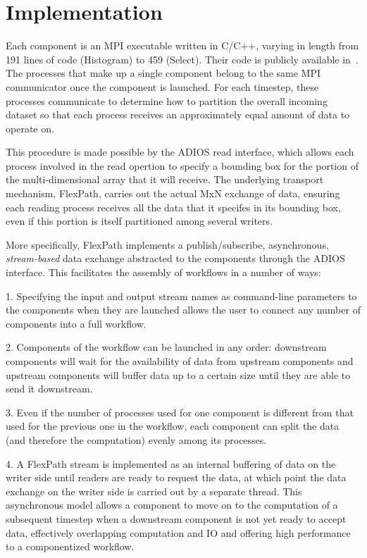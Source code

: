 \section{Implementation}
\label{s:impl}

Each component is an MPI executable
written in C/C++, varying in length from
191 lines of code (Histogram) to
459 (Select).
Their code is publicly available
in~\cite{champsaur:superglue-repo}.
The processes that make up a single
component belong to the same MPI communicator
once the component is launched.
For each timestep, these processes
communicate to determine how to partition
the overall incoming dataset so that each
process receives an approximately
equal amount of data to operate on.

This procedure is made possible by the ADIOS
read interface, which allows each process
involved in the read opertion to specify a
bounding box for the portion of the multi-dimensional
array that it will receive.
The underlying transport mechanism, FlexPath,
carries out the actual MxN exchange of data,
ensuring each reading process receives
all the data that it specifes in its bounding box,
even if this portion is itself partitioned among several writers.

More specifically, FlexPath implements a publish/subscribe,
asynchronous, \textit{stream-based} data exchange abstracted to the
components through the ADIOS interface. This facilitates
the assembly of \sys workflows in a number of ways:

1. Specifying the input and output stream
names as command-line parameters to the \sys components 
when they are launched allows the user
to connect any number of components into
a full workflow.

2. Components of the workflow can be
launched in any order: downstream components
will wait for the availability of data from
upstream components and upstream
components will buffer data up to a certain
size until they are able to send it
downstream.

3. Even if the number of processes used for one
component is different from that used for the previous
one in the workflow, each component can split the data
(and therefore the computation) evenly among its processes.

4. A FlexPath stream is implemented as
an internal buffering of data on the writer side
until readers are ready to request the data,
at which point the data exchange
on the writer side is carried out
by a separate thread.
This asynchronous model allows a 
\sys component to move on to the computation
of a subsequent timestep when a downstream
component is not yet ready to accept data,
effectively overlapping computation and IO
and offering high performance to a componentized workflow.

